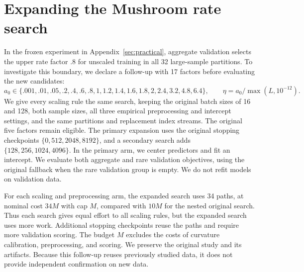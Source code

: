 \section{Expanding the Mushroom rate search}
\label{sec:mushroom-rate-search}

In the frozen experiment in Appendix~\ref{sec:practical}, aggregate validation
selects the upper rate factor $.8$ for unscaled training in all 32 large-sample
partitions. To investigate this boundary, we declare a follow-up with 17 factors
before evaluating the new candidates:
\[
 a_0 \in \{.001,.01,.05,.2,.4,.6,.8,1,1.2,1.4,1.6,1.8,2,2.4,3.2,4.8,6.4\}, \qquad \eta
     = a_0/\max(L,10^{-12}).
\]
We give every scaling rule the same search, keeping the original batch sizes of
16 and 128, both sample sizes, all three empirical preprocessing and intercept
settings, and the same partitions and replacement index streams. The original
five factors remain eligible. The primary expansion uses the original stopping
checkpoints $\{0,512,2048,8192\}$, and a secondary search adds
$\{128,256,1024,4096\}$. In the primary arm, we center predictors and fit an
intercept. We evaluate both aggregate and rare validation objectives, using the
original fallback when the rare validation group is empty. We do not refit
models on validation data.

For each scaling and preprocessing arm, the expanded search uses 34 paths, at
nominal cost $34M$ with cap $M$, compared with $10M$ for the nested original
search. Thus each search gives equal effort to all scaling rules, but the
expanded search uses more work. Additional stopping checkpoints reuse the paths
and require more validation scoring. The budget $M$ excludes the costs of
curvature calibration, preprocessing, and scoring. We preserve the original
study and its artifacts. Because this follow-up reuses previously studied data,
it does not provide independent confirmation on new data.

